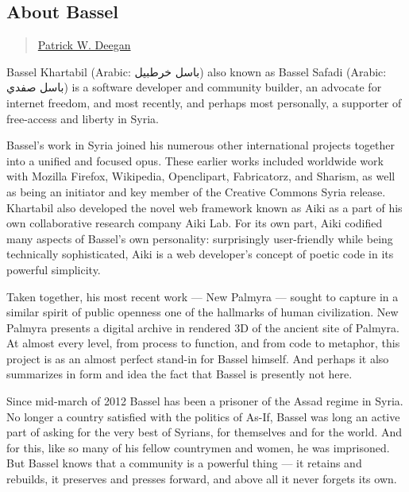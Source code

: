 \subsection{About Bassel}\label{about-bassel}

\begin{quote}
\hyperlink{patrick-w-deegan}{Patrick W.
Deegan}
\end{quote}

Bassel Khartabil (Arabic: باسل خرطبيل‎) also known as Bassel Safadi
(Arabic: باسل صفدي‎) is a software developer and community builder, an
advocate for internet freedom, and most recently, and perhaps most
personally, a supporter of free-access and liberty in Syria.

Bassel's work in Syria joined his numerous other international projects
together into a unified and focused opus. These earlier works included
worldwide work with Mozilla Firefox, Wikipedia, Openclipart,
Fabricatorz, and Sharism, as well as being an initiator and key member
of the Creative Commons Syria release. Khartabil also developed the
novel web framework known as Aiki as a part of his own collaborative
research company Aiki Lab. For its own part, Aiki codified many aspects
of Bassel's own personality: surprisingly user-friendly while being
technically sophisticated, Aiki is a web developer's concept of poetic
code in its powerful simplicity.

Taken together, his most recent work --- New Palmyra --- sought to
capture in a similar spirit of public openness one of the hallmarks of
human civilization. New Palmyra presents a digital archive in rendered
3D of the ancient site of Palmyra. At almost every level, from process
to function, and from code to metaphor, this project is as an almost
perfect stand-in for Bassel himself. And perhaps it also summarizes in
form and idea the fact that Bassel is presently not here.

Since mid-march of 2012 Bassel has been a prisoner of the Assad regime
in Syria. No longer a country satisfied with the politics of As-If,
Bassel was long an active part of asking for the very best of Syrians,
for themselves and for the world. And for this, like so many of his
fellow countrymen and women, he was imprisoned. But Bassel knows that a
community is a powerful thing --- it retains and rebuilds, it preserves
and presses forward, and above all it never forgets its own.

